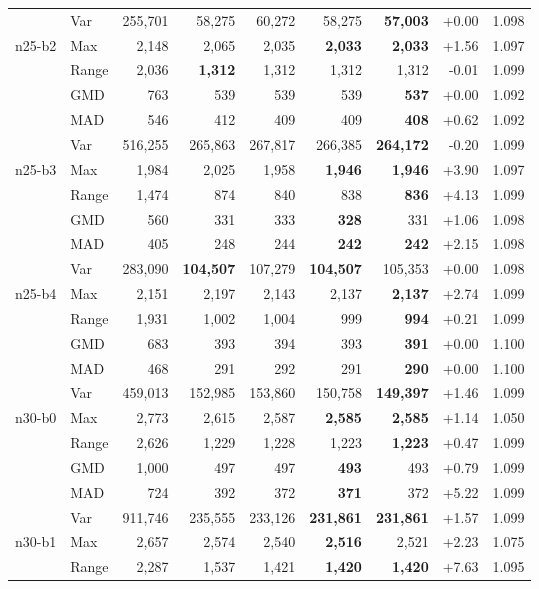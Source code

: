\begin{small}
\begin{longtable}{llrrrrrrr}
 & Var & 255,701 & 58,275 & 60,272 & 58,275 & \textbf{57,003} & +0.00 & 1.098 \\
n25-b2 & Max & 2,148 & 2,065 & 2,035 & \textbf{2,033} & \textbf{2,033} & +1.56 & 1.097 \\
 & Range & 2,036 & \textbf{1,312} & 1,312 & 1,312 & 1,312 & -0.01 & 1.099 \\
 & GMD & 763 & 539 & 539 & 539 & \textbf{537} & +0.00 & 1.092 \\
 & MAD & 546 & 412 & 409 & 409 & \textbf{408} & +0.62 & 1.092 \\
 & Var & 516,255 & 265,863 & 267,817 & 266,385 & \textbf{264,172} & -0.20 & 1.099 \\
n25-b3 & Max & 1,984 & 2,025 & 1,958 & \textbf{1,946} & \textbf{1,946} & +3.90 & 1.097 \\
 & Range & 1,474 & 874 & 840 & 838 & \textbf{836} & +4.13 & 1.099 \\
 & GMD & 560 & 331 & 333 & \textbf{328} & 331 & +1.06 & 1.098 \\
 & MAD & 405 & 248 & 244 & \textbf{242} & \textbf{242} & +2.15 & 1.098 \\
 & Var & 283,090 & \textbf{104,507} & 107,279 & \textbf{104,507} & 105,353 & +0.00 & 1.098 \\
n25-b4 & Max & 2,151 & 2,197 & 2,143 & 2,137 & \textbf{2,137} & +2.74 & 1.099 \\
 & Range & 1,931 & 1,002 & 1,004 & 999 & \textbf{994} & +0.21 & 1.099 \\
 & GMD & 683 & 393 & 394 & 393 & \textbf{391} & +0.00 & 1.100 \\
 & MAD & 468 & 291 & 292 & 291 & \textbf{290} & +0.00 & 1.100 \\
 & Var & 459,013 & 152,985 & 153,860 & 150,758 & \textbf{149,397} & +1.46 & 1.099 \\
n30-b0 & Max & 2,773 & 2,615 & 2,587 & \textbf{2,585} & \textbf{2,585} & +1.14 & 1.050 \\
 & Range & 2,626 & 1,229 & 1,228 & 1,223 & \textbf{1,223} & +0.47 & 1.099 \\
 & GMD & 1,000 & 497 & 497 & \textbf{493} & 493 & +0.79 & 1.099 \\
 & MAD & 724 & 392 & 372 & \textbf{371} & 372 & +5.22 & 1.099 \\
 & Var & 911,746 & 235,555 & 233,126 & \textbf{231,861} & \textbf{231,861} & +1.57 & 1.099 \\
n30-b1 & Max & 2,657 & 2,574 & 2,540 & \textbf{2,516} & 2,521 & +2.23 & 1.075 \\
 & Range & 2,287 & 1,537 & 1,421 & \textbf{1,420} & \textbf{1,420} & +7.63 & 1.095 \\

\end{longtable}
\end{small}
